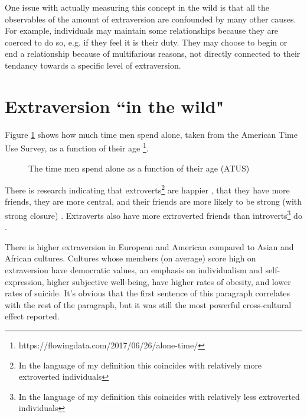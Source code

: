 \documentclass[]{article}
\begin{document}
	One issue with actually measuring this concept in the wild is that all the observables of the amount of extraversion are confounded by many other causes. For example, individuals may maintain some relationships because they are coerced to do so, e.g. if they feel it is their duty. They may choose to begin or end a relationship because of multifarious reasons, not directly connected to their tendancy towards a specific level of extraversion. 
	
	\section{Extraversion ``in the wild"}
	Figure \ref{fig:male-alone-time-as-we-age} shows how much time men spend alone, taken from the American Time Use Survey, as a function of their age \footnote{https://flowingdata.com/2017/06/26/alone-time/}.
	
	\begin{figure}
		\centering
		\caption{The time men spend alone as a function of their age (ATUS)}
		\label{fig:male-alone-time-as-we-age}
	\end{figure}

	There is research indicating that extroverts\footnote{In the language of my definition this coincides with relatively more extroverted individuals} are happier \cite{Oerlemans2014}, that they have more friends, they are more central, and their friends are more likely to be strong (with strong closure) \cite{Staiano2012}. Extraverts also have more extroverted friends than introverts\footnote{In the language of my definition this coincides with relatively less extroverted individuals} do \cite{Feiler2014}.
	
	There is higher extraversion in European and American compared to Asian and African cultures. 
	Cultures whose members (on average) score high on extraversion have democratic values, an emphasis on individualism and self-expression, higher subjective well-being, have higher rates of obesity, and lower rates of suicide. \cite{Terracciano2006}
	It's obvious that the first sentence of this paragraph correlates with the rest of the paragraph, but it was still the most powerful cross-cultural effect reported.
	
\end{document}
